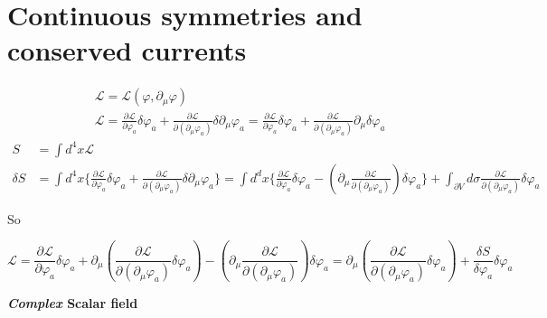 \documentclass[twoside]{amsart}
\begin{document}
\section{Continuous symmetries and conserved currents}


\[
\begin{aligned}
  & \mathcal{L} = \mathcal{L}( \varphi, \partial_{\mu} \varphi) \\ 
  & \mathcal{L} = \frac{ \partial \mathcal{L}}{ \partial \varphi_a} \delta \varphi_a + \frac{ \partial \mathcal{L} }{ \partial ( \partial_{\mu} \varphi_a ) } \delta  \partial_{\mu} \varphi_a = \frac{ \partial \mathcal{L}}{ \partial \varphi_a} \delta \varphi_a + \frac{ \partial \mathcal{L}}{ \partial ( \partial_{\mu} \varphi_a ) } \partial_{\mu} \delta \varphi_a
\end{aligned}
\]
\[
\begin{aligned}
   S & = \int d^4x \mathcal{L} \\ 
   \delta S & = \int d^4x \lbrace \frac{ \partial \mathcal{L} }{ \partial \varphi_a } \delta \varphi_a + \frac{ \partial \mathcal{L} }{ \partial ( \partial_{\mu} \varphi_a ) } \delta \partial_{\mu} \varphi_a \rbrace = \int d^dx \lbrace \frac{ \partial \mathcal{L}}{ \partial \varphi_a } \delta \varphi_a - \left( \partial_{\mu} \frac{ \partial \mathcal{L} }{ \partial ( \partial_{\mu} \varphi_a ) } \right) \delta \varphi_a \rbrace + \int_{\partial V} d\sigma \frac{ \partial \mathcal{L}}{ \partial ( \partial_{\mu} \varphi_a  ) } \delta \varphi_a 
\end{aligned}
\]

So

\[
\mathcal{L} = \frac{ \partial \mathcal{L}}{ \partial \varphi_a} \delta \varphi_a + \partial_{\mu} \left( \frac{ \partial \mathcal{L} }{ \partial ( \partial_{\mu} \varphi_a ) } \delta \varphi_a \right) - \left( \partial_{\mu} \frac{ \partial \mathcal{L} }{ \partial ( \partial_{\mu} \varphi_a  )} \right) \delta \varphi_a = \partial_{\mu} \left( \frac{ \partial \mathcal{L}}{ \partial ( \partial_{\mu} \varphi_a ) } \delta \varphi_a \right) + \frac{ \delta S }{ \delta \varphi_a } \delta \varphi_a
\]

\textbf{ \emph{Complex} Scalar field }
\end{document}
